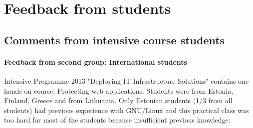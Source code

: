 \appendix
{}
\makeatletter
\renewcommand{\@makechapterhead}[1]{%
	\vspace*{1 pt}%
	{\color{chapters}\setlength{\parindent}{0pt} \raggedright \normalfont
	\bfseries\Huge\thechapter\ #1
	\par\nobreak\vspace{1 pt}}}
\makeatother













\chapter{Feedback from students}
\section{Comments from intensive course students}



\subsubsection{Feedback from second group: International students}
Intensive Programme 2013 "Deploying IT Infrastructure Solutions" contains one hands-on course: Protecting web applications. Students were from Estonia, Finland, Greece and from Lithuania. 
Only Estonian students (1/3 from all students) had previous experience with GNU/Linux and this practical class was too hard for most of the students because insufficient previous knowledge:

